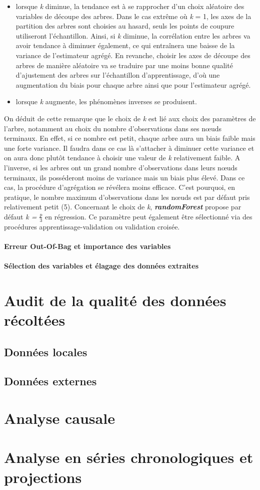 	\begin{itemize}
	\item lorsque \textit{k} diminue, la tendance est à se rapprocher d’un choix aléatoire des variables
	de découpe des arbres. Dans le cas extrême où \textit{k} = 1, les axes de la partition des arbres
	sont choisies au hasard, seuls les points de coupure utiliseront l’échantillon. Ainsi, si \textit{k}
	diminue, la corrélation entre les arbres va avoir tendance à diminuer également, ce qui
	entraînera une baisse de la variance de l’estimateur agrégé. En revanche, choisir les axes
	de découpe des arbres de manière aléatoire va se traduire par une moins bonne
	qualité d’ajustement des arbres sur l’échantillon d’apprentissage, d’où une augmentation
	du biais pour chaque arbre ainsi que pour l’estimateur agrégé.
	\item lorsque \textit{k} augmente, les phénomènes inverses se produisent.
	\end{itemize}
	On déduit de cette remarque que le choix de \textit{k} est lié aux choix des paramètres de l’arbre,
	notamment au choix du nombre d’observations dans ses nœuds terminaux. En effet, si ce
	nombre est petit, chaque arbre aura un biais faible mais une forte variance. Il faudra dans ce cas là s’attacher à diminuer cette variance et on aura donc plutôt tendance à choisir une
	valeur de \textit{k} relativement faible. A l’inverse, si les arbres ont un grand nombre d’observations
	dans leurs nœuds terminaux, ils posséderont moins de variance mais un biais plus élevé. Dans
	ce cas, la procédure d’agrégation se révélera moins efficace. C’est pourquoi, en pratique, le
	nombre maximum d’observations dans les nœuds est par défaut pris relativement petit (5). Concernant le choix de \textit{k}, \textit{\textbf{randomForest}} propose par
	défaut \textit{k = $\frac{p}{3}$} en régression. Ce paramètre peut également
	être sélectionné via des procédures apprentissage-validation ou validation croisée.
	\paragraph{Erreur Out-Of-Bag et importance des variables}
	\paragraph{Sélection des variables et élagage des données extraites}
	\section{Audit de la qualité des données récoltées}
	\subsection{Données locales}
	\subsection{Données externes}
	\section{Analyse causale}
	\section{Analyse en séries chronologiques et projections}